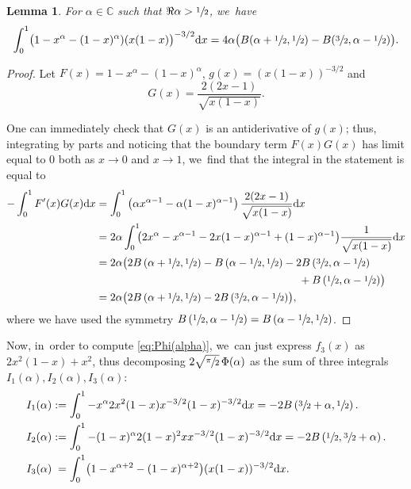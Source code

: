 \documentclass[JEP,XML,SOM,Unicode,NoFloatCountersInSection, NoEqCountersInSection,published]{cedram}
\newcommand{\dd}{\mathrm{d}}
\newtheorem{lem}[thm]{Lemma}
\theoremstyle{definition}
\begin{document}
\begin{lem}\label{lemma:MysteriousPiece}
For $\alpha\in\mathbb{C}$ such that $\Re \alpha > \sfrac{1}{2}$, we~have
\[
\int_0^1 \bigl(1-x^\alpha-(1-x)^\alpha) (x(1-x)\bigr)^{-3/2} \dd x = 4\alpha \bigl(B(\alpha+\sfrac{1}{2}, \sfrac{1}{2}) -B(\sfrac{3}{2}, \alpha-\sfrac{1}{2}) \bigr).
\]
\end{lem}
\begin{proof}
Let $F(x)=1-x^\alpha-(1-x)^\alpha$, $g(x)=(x(1-x))^{-3/2}$ and
\[
G(x) = \frac{2(2x-1)}{\sqrt{x(1-x)}}.
\]

One can immediately check that $G(x)$ is an antiderivative of $g(x)$;
thus, integrating by parts and noticing that the boundary term $F(x)G(x)$ has limit equal to $0$ both as $x \to 0$ and $x \to 1$, we~find that the integral in the statement is equal to
\[
\begin{aligned}
-\int_0^1 F'(x) G(x) \dd x  &=
\int_0^1 \left(\alpha x^{\alpha-1}-\alpha (1-x)^{\alpha-1}\right) \frac{2(2x-1)}{\sqrt{x(1-x)}} \dd x \\
& = 2\alpha \int_0^1 \hspace*{-1mm}\bigl(2x^{\alpha} -x^{\alpha-1}-2x(1-x)^{\alpha-1} + (1-x)^{\alpha-1} \bigr) \frac{1}{\sqrt{x(1-x)}} \dd x \\
& = 2\alpha \bigl(2B\left(\alpha+\sfrac{1}{2}, \sfrac{1}{2}\right) - B\left(\alpha-\sfrac{1}{2}, \sfrac{1}{2}\right) -2B\left(\sfrac{3}{2}, \alpha-\sfrac{1}{2}\right)\\
&\hspace*{6.6cm}+B\left(\sfrac{1}{2},\alpha-\sfrac{1}{2}\right) \bigr) \\
& = 2\alpha \bigl(2B\left(\alpha+\sfrac{1}{2}, \sfrac{1}{2}\right) -2B\left(\sfrac{3}{2}, \alpha-\sfrac{1}{2}\right) \bigr),
\end{aligned}
\]
where we have used the symmetry $B\left(\sfrac{1}{2},\alpha-\sfrac{1}{2}\right)=B\left(\alpha-\sfrac{1}{2}, \sfrac{1}{2}\right)$.
\end{proof}
Now, in~order to compute \eqref{eq:Phi(alpha)}, we~can just express $f_3(x)$ as $2x^2(1-x) + x^2$, thus decomposing $2\sqrt{\sfrac{\pi}{2}}\,\Phi(\alpha)$ as the sum of three integrals $I_1(\alpha), I_2(\alpha), I_3(\alpha)$:
\begin{align*}
I_1(\alpha) &:= \int_0^1 -x^{\alpha} 2x^2 (1-x) x^{-3/2}(1-x)^{-3/2} \dd x = -2B\left(\sfrac{3}{2}+\alpha, \sfrac{1}2\right).
\\
I_2(\alpha) &:= \int_0^1 -(1-x)^{\alpha} 2(1-x)^2 x x^{-3/2}(1-x)^{-3/2} \dd x = -2B\left(\sfrac{1}2, \sfrac{3}{2}+\alpha\right).
\\
I_3(\alpha) &\hphantom{:}= \int_0^1 \bigl(1-x^{\alpha+2}-(1-x)^{\alpha+2}\bigr) (x(1-x))^{-3/2} \dd x.
\end{align*}
\end{document}
